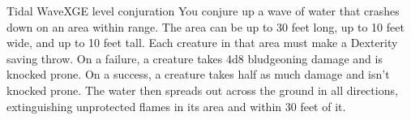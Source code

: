 \begin{spell}{Tidal Wave}{XGE}{ level conjuration}
{
}
You conjure up a wave of water that crashes down on an area within range. The
area can be up to 30 feet long, up to 10 feet wide, and up to 10 feet tall.
Each creature in that area must make a Dexterity saving throw. On a failure,
a creature takes 4d8 bludgeoning damage and is knocked prone. On a success, a
creature takes half as much damage and isn’t knocked prone. The water then
spreads out across the ground in all directions, extinguishing unprotected
flames in its area and within 30 feet of it.
\end{spell}
